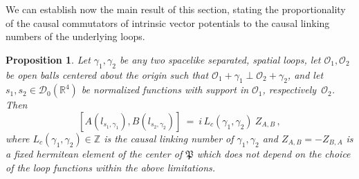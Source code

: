 \documentclass[11pt]{article}
\newtheorem{proposition}[theorem]{Proposition}
\numberwithin{equation}{section}
\newcommand{\RR}{{\mathbb R}}
\newcommand{\ZZ}{{\mathbb Z}}
\newcommand{\Dc}{{\mathcal{D}}}
\newcommand{\Oc}{{\mathcal{O}}}
\newcommand{\fP}{{\mathfrak P}}
\begin{document}
We can establish now the main result of this section, 
stating the proportionality of the causal commutators of intrinsic 
vector potentials to the causal linking numbers of the underlying loops. 
%
\begin{proposition}
\label{prop.3.3}
Let $\gamma_1,\gamma_2$ be any two spacelike separated, spatial loops,  
let $\Oc_1,\Oc_2$  be open balls centered about the origin 
such that $\Oc_1 + \gamma_1 \perp \Oc_2+\gamma_2$, and 
let $s_1,s_2 \in \Dc_0(\RR^4)$ be normalized  
functions with support in $\Oc_1$, respectively~$\Oc_2$. Then 
$$
[ A(l_{s_1,\gamma_1}) , B(l_{s_2,\gamma_2}) ] 
\ = \ 
i \, L_c(\gamma_1,\gamma_2) \ Z_{A,B} \, ,
$$
where $L_c(\gamma_1,\gamma_2) \in \ZZ$ is the causal linking
number of $\gamma_1, \gamma_2$ and 
$Z_{A,B} = - Z_{B,A}$ is a fixed hermitean element of the center of $\fP$
which does not depend on the choice of the loop functions
within the above limitations. 
\end{proposition}
\end{document}
